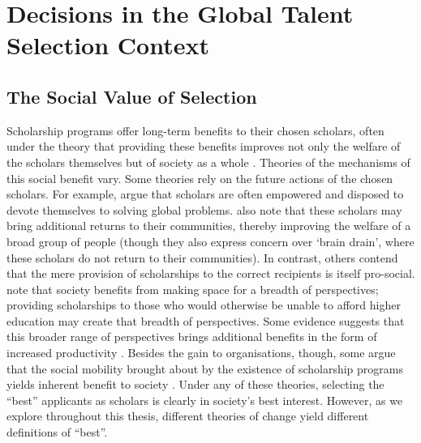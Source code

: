 

\chapter{\label{ch:context}Decisions in the Global Talent Selection Context} 
\minitoc

\section{The Social Value of Selection}\label{sec:social_value}
Scholarship programs offer long-term benefits to their chosen scholars, often under the theory that providing these benefits improves not only the welfare of the scholars themselves but of society as a whole \cite{DilraboJonbekova_Ruby_2023,Dassin_Marsh_Mawer_2018}. Theories of the mechanisms of this social benefit vary. Some theories rely on the future actions of the chosen scholars. For example, \textcite{Dassin_Marsh_Mawer_2018} argue that scholars are often empowered and disposed to devote themselves to solving global problems. \textcite{Dassin_Marsh_Mawer_2018} also note that these scholars may bring additional returns to their communities, thereby improving the welfare of a broad group of people (though they also express concern over `brain drain', where these scholars do not return to their communities). In contrast, others contend that the mere provision of scholarships to the correct recipients is itself pro-social. \textcite{minkin2023diversity} note that society benefits from making space for a breadth of perspectives; providing scholarships to those who would otherwise be unable to afford higher education may create that breadth of perspectives. Some evidence suggests that this broader range of perspectives brings additional benefits in the form of increased productivity \cite{autor2008does,noray2023systemic}. Besides the gain to organisations, though, some argue that the social mobility brought about by the existence of scholarship programs yields inherent benefit to society \cite{Dassin_Marsh_Mawer_2018}. Under any of these theories, selecting the ``best'' applicants as scholars is clearly in society's best interest. However, as we explore throughout this thesis, different theories of change yield different definitions of ``best''.

